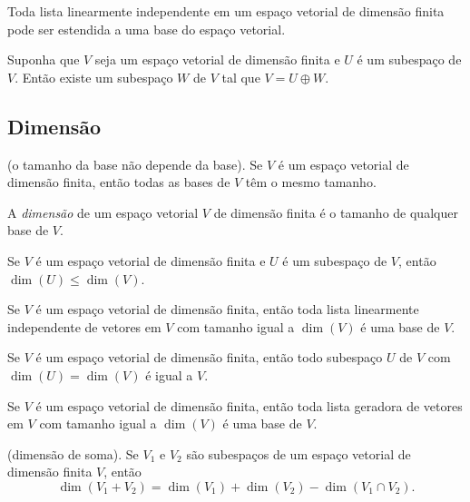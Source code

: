 \documentclass{article}
\begin{document}
\begin{prop}
    Toda lista linearmente independente em um espaço vetorial de dimensão finita pode ser estendida a uma base do espaço vetorial.
\end{prop}

\begin{prop}
    Suponha que \(V\) seja um espaço vetorial de dimensão finita e \(U\) é um subespaço de \(V\). Então existe um subespaço \(W\) de \(V\) tal que \(V = U \oplus W\).
\end{prop}

\subsection{Dimensão}
\begin{prop} (o tamanho da base não depende da base).
    Se \(V\) é um espaço vetorial de dimensão finita, então todas as bases de \(V\) têm o mesmo tamanho.
\end{prop}

\begin{defn}
    A \emph{dimensão} de um espaço vetorial \(V\) de dimensão finita é o tamanho de qualquer base de \(V\).
\end{defn}

\begin{prop}
    Se \(V\) é um espaço vetorial de dimensão finita e \(U\) é um subespaço de \(V\), então \(\dim(U) \leq \dim(V)\).
\end{prop}

\begin{thm}
    Se \(V\) é um espaço vetorial de dimensão finita, então toda lista linearmente independente de vetores em \(V\) com tamanho igual a \(\dim(V)\) é uma base de \(V\).
\end{thm}

\begin{cor}
    Se \(V\) é um espaço vetorial de dimensão finita, então todo subespaço \(U\) de \(V\) com \(\dim(U) = \dim(V)\) é igual a \(V\).
\end{cor}

\begin{thm}
    Se \(V\) é um espaço vetorial de dimensão finita, então toda lista geradora de vetores em \(V\) com tamanho igual a \(\dim(V)\) é uma base de \(V\).
\end{thm}

\begin{prop} (dimensão de soma).
    Se \(V_1\) e \(V_2\) são subespaços de um espaço vetorial de dimensão finita \(V\), então
    \begin{equation}
        \dim(V_1 + V_2) = \dim(V_1) + \dim(V_2) - \dim(V_1 \cap V_2).
    \end{equation}
\end{prop}
\end{document}

